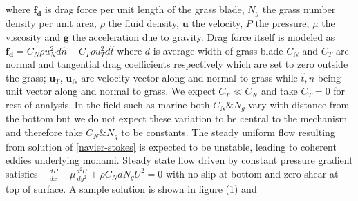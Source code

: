 \documentclass[aps,prl,twocolumn,showpacs,superscriptaddress,groupedaddress,10pt]{revtex4-1}  %
\newcommand{\bu}{\mathbf{u}}
\newcommand{\del}{\partial}
\begin{document}
where $\mathbf{f_{d}}$ is drag force per unit length of the grass blade, $N_g$ the grass number density per unit area, $\rho$ the fluid density, $\mathbf{u}$ the velocity, 
$P$ the pressure, $\mu$ the viscosity and $\mathbf{g}$ the acceleration due to gravity. Drag force itself is modeled 
as $\mathbf{f_{d}}=C_N \rho u_{N}^{2}d\hat{n}+C_{T}\rho u_{T}^{2}d\hat{t}$ where $d$ is average width of grass blade
$C_{N}$ and $C_{T}$ are normal and tangential drag coefficients respectively which are set to zero outside the grass; $\bu_{T}$, $\bu_{N}$ are velocity vector along and
normal to grass while $\hat{t},\hat{n}$ being unit vector along and normal to grass. We expect $C_T \ll C_N$ and take $C_T=0$ for rest of analysis. In the field such as marine
both $C_N \& N_g$ vary with distance from the bottom but we do not expect these variation to be central to the mechanism and therefore take $C_N \& N_g$ to be constants.
\newline
The steady uniform flow resulting from solution of \eqref{navier-stokes} is expected to be unstable, leading to coherent eddies underlying monami. Steady state flow driven by   
constant pressure gradient satisfies
$-\frac{dP}{dx}+\mu\frac{d^2U}{dy^2}+\rho C_N d N_gU^2=0$ with no slip at bottom and zero shear at top of surface. A sample solution is shown in figure (1) and 
\end{document}
